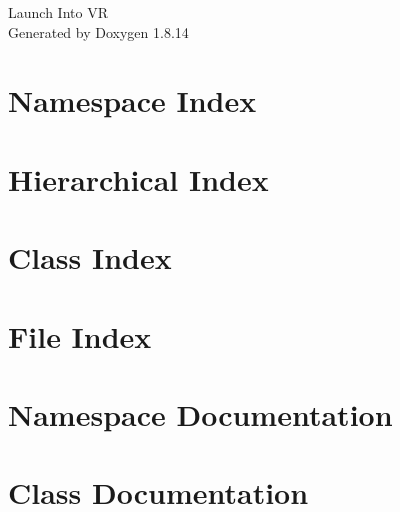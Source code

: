 \documentclass[twoside]{book}
\newcommand{\+}{\discretionary{\mbox{\scriptsize$\hookleftarrow$}}{}{}}
\newcommand{\clearemptydoublepage}{%
  \newpage{\pagestyle{empty}\cleardoublepage}%
}
\begin{document}
\hypersetup{pageanchor=false,
             bookmarksnumbered=true,
             pdfencoding=unicode
            }
\begin{titlepage}
\vspace*{7cm}
\begin{center}%
{\Large Launch Into VR }\\
\vspace*{1cm}
{\large Generated by Doxygen 1.8.14}\\
\end{center}
\end{titlepage}
\clearemptydoublepage
{}
\tableofcontents
\clearemptydoublepage
{}
\hypersetup{pageanchor=true}

\chapter{Namespace Index}

\chapter{Hierarchical Index}

\chapter{Class Index}

\chapter{File Index}

\chapter{Namespace Documentation}


\chapter{Class Documentation}

























\end{document}

